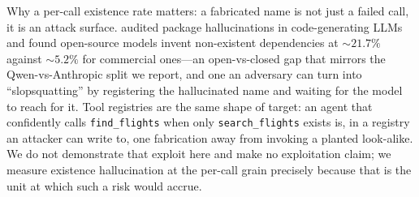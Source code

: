 Why a per-call existence rate matters: a fabricated name is not just a
failed call, it is an attack surface. \citet{spracklen2025packages}
audited package hallucinations in code-generating LLMs and found
open-source models invent non-existent dependencies at $\sim\!21.7\%$
against $\sim\!5.2\%$ for commercial ones---an open-vs-closed gap that
mirrors the Qwen-vs-Anthropic split we report, and one an adversary can
turn into ``slopsquatting'' by registering the hallucinated name and
waiting for the model to reach for it. Tool registries are the same
shape of target: an agent that confidently calls \texttt{find\_flights}
when only \texttt{search\_flights} exists is, in a registry an attacker
can write to, one fabrication away from invoking a planted look-alike.
We do not demonstrate that exploit here and make no exploitation claim;
we measure existence hallucination at the per-call grain precisely
because that is the unit at which such a risk would accrue.
